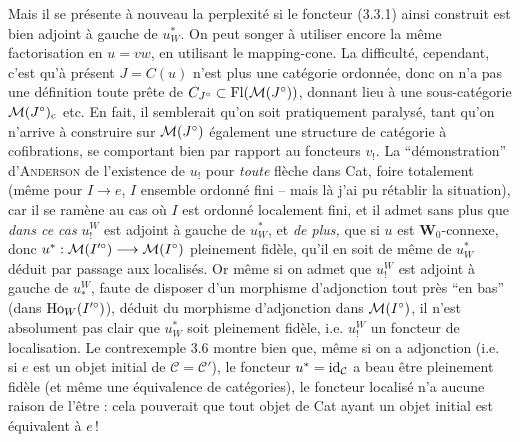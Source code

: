 Mais il se présente à nouveau la perplexité si le foncteur (3.3.1) ainsi construit est bien adjoint à gauche de $u_W^*$. On peut songer à utiliser encore la même factorisation en $u = vw$, en
utilisant le mapping-cone. La difficulté, cependant, c'est qu'à présent $J = C(u)$ n'est plus une catégorie ordonnée, donc on n'a pas une définition toute prête de $C_{J^\circ}\subset\mathrm{Fl}(\mathcal{M}(J^\circ))$, donnant lieu à une sous-catégorie $\mathcal{M}(J^\circ)_{\mathrm{c}}$ etc. En fait, il semblerait qu'on soit pratiquement paralysé, tant qu'on n'arrive à construire sur $\mathcal{M}(J^\circ)$ également une structure de catégorie à cofibrations, se comportant bien par rapport au foncteurs $v_!$. La %
“démonstration” d'\textsc{Anderson} de l'existence de $u_!$ pour \textit{toute} flèche dans Cat, foire totalement (même pour $I\longrightarrow e$, $I$ ensemble ordonné fini – mais là j'ai pu rétablir la situation), car il se ramène au cas où $I$ est ordonné localement fini, et il
admet sans plus que \textit{dans ce cas} $u_!^W$ est adjoint à gauche de $u_W^*$, et \textit{de plus,} que si $u$ est $\mathbf{W}_0$-connexe, donc $u^* : \mathcal{M}(I'^\circ)\longrightarrow\mathcal{M}(I^\circ)$ pleinement fidèle, qu'il en soit de même de $u_W^*$ déduit par passage aux localisés. Or même si on admet que $u_!^W$ est adjoint à gauche de
$u_*^W$, faute de disposer d'un morphisme d'adjonction tout près “en bas” (dans $\operatorname{Ho}_W(I'^\circ)$), %
déduit du morphisme d'adjonction dans $\mathcal{M}(I^\circ)$, il n'est absolument pas clair que $u_W^*$ soit pleinement fidèle, i.e. $u_!^W$ un foncteur de localisation. Le contrexemple 3.6 montre bien que, même si on a adjonction (i.e. si $e$ est un objet initial de $\mathcal{C} = \mathcal{C}'$), le foncteur $u^* = \mathrm{id}_{\mathcal{C}}$ a beau être pleinement fidèle (et même une équivalence de catégories), le foncteur localisé n'a aucune raison de l'être : cela pouverait que tout objet de Cat ayant un objet initial %
est équivalent à $e$\,!

